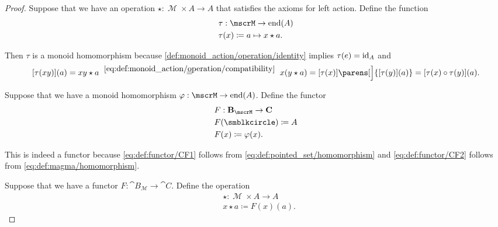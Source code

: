 \begin{proof}
   Suppose that we have an operation \( \star: \mscrM \times A \to A \) that satisfies the axioms for left action. Define the function
  \begin{equation*}
    \begin{aligned}
      &\tau: \mscrM \to \End(A) \\
      &\tau(x) \coloneqq a \mapsto x \star a.
    \end{aligned}
  \end{equation*}

  Then \( \tau \) is a monoid homomorphism because \ref{def:monoid_action/operation/identity} implies \( \tau(e) = \operatorname{id}_A \) and
  \begin{equation}\label{def:monoid_action/homomorphism/proof}
    [\tau(xy)](a)
    =
    xy \star a
    \reloset {\eqref{eq:def:monoid_action/operation/compatibility}} =
    x (y \star a)
    =
    [\tau(x)]\parens[\Big]{ [\tau(y)](a) }
    =
    [\tau(x) \bincirc \tau(y)](a).
  \end{equation}

   Suppose that we have a monoid homomorphism \( \varphi: \mscrM \to \End(A) \). Define the functor
  \begin{equation*}
    \begin{aligned}
      &F: \cat{B}_\mscrM \to \cat{C} \\
      &F(\anon) \coloneqq A \\
      &F(x) \coloneqq \varphi(x).
    \end{aligned}
  \end{equation*}

  This is indeed a functor because \eqref{eq:def:functor/CF1} follows from \eqref{eq:def:pointed_set/homomorphism} and \eqref{eq:def:functor/CF2} follows from \eqref{eq:def:magma/homomorphism}.

   Suppose that we have a functor \( F: \cat{B}_\mscrM \to \cat{C} \). Define the operation
  \begin{equation*}
    \begin{aligned}
      &\star: \mscrM \times A \to A \\
      &x \star a \coloneqq F(x)(a).
    \end{aligned}
  \end{equation*}


\end{proof}
